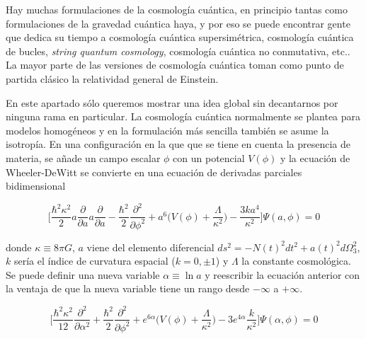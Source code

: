 \documentclass[11pt,a4paper,titlepage]{article}
\begin{document}
Hay muchas formulaciones de la cosmología cuántica, en principio tantas como formulaciones de la gravedad cuántica haya, y por eso se puede encontrar gente que dedica su tiempo a cosmología cuántica supersimétrica, cosmología cuántica de bucles, \emph{string quantum cosmology}, cosmología cuántica no conmutativa, etc.. La mayor parte de las versiones de cosmología cuántica toman como punto de partida clásico la relatividad general de Einstein.

En este apartado sólo queremos mostrar una idea global sin decantarnos por ninguna rama en particular. La cosmología cuántica normalmente se plantea para modelos homogéneos y en la formulación más sencilla también se asume la isotropía. En una configuración en la que que se tiene en cuenta la presencia de materia, se añade un campo escalar $\phi$ con un potencial $V(\phi)$ y la ecuación de Wheeler-DeWitt se convierte en una ecuación de derivadas parciales bidimensional

\begin{equation*}
 \Bigg[\frac{\hbar^2\kappa^2}{2}a\frac{\partial}{\partial a}a\frac{\partial }{\partial a}-\frac{\hbar^2}{2}\frac{\partial^2}{\partial\phi^2}+a^6\Big(V(\phi)+\frac{\Lambda}{\kappa^2}\Big)-\frac{3ka^4}{\kappa^2}\Bigg]\Psi(a,\phi)=0
\end{equation*}

donde $\kappa\equiv8\pi G$, $a$ viene del elemento diferencial $ds^2=-N(t)^2dt^2+a(t)^2d\Omega_3^2$, $k$ sería el índice de curvatura espacial ($k=0,\pm1$) y $\Lambda$ la constante cosmológica. Se puede definir una nueva variable $\alpha\equiv\ln a$ y reescribir la ecuación anterior con la ventaja de que la nueva variable tiene un rango desde $-\infty$ a $+\infty$.

\begin{equation*}
 \Bigg[\frac{\hbar^2\kappa^2}{12}\frac{\partial^2}{\partial\alpha^2}+\frac{\hbar^2}{2}\frac{\partial^2}{\partial\phi^2}+e^{6\alpha}\Big(V(\phi)+\frac{\Lambda}{\kappa^2}\Big)-3e^{4\alpha}\frac{k}{\kappa^2}\Bigg]\Psi(\alpha,\phi)=0
\end{equation*}
\end{document}
